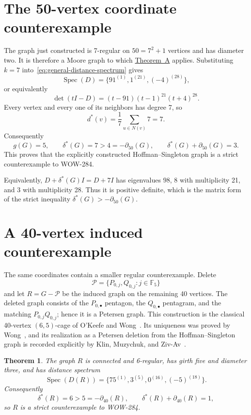 \documentclass[a4paper,11pt,reqno]{amsart}
\theoremstyle{plain}
\newtheorem{theorem}{Theorem}[section]
\theoremstyle{definition}
\theoremstyle{remark}
\newcommand{\F}{\mathbb F_5}
\newcommand{\Spec}{\operatorname{Spec}}
\begin{document}
\section{The 50-vertex coordinate counterexample}

The graph just constructed is 7-regular on \(50=7^2+1\) vertices and has
diameter two.  It is therefore a Moore graph to which
\hyperref[thm:moore-wow]{Theorem~A} applies.  Substituting \(k=7\)
into~\eqref{eq:general-distance-spectrum} gives
\begin{equation}\label{eq:distance-spectrum}
 \Spec(D)=\{91^{(1)},1^{(21)},(-4)^{(28)}\},
\end{equation}
or equivalently
\[
 \det(tI-D)=(t-91)(t-1)^{21}(t+4)^{28}.
\]
Every vertex and every one of its neighbors has degree 7, so
\[
 d^*(v)=\frac{1}{7}\sum_{u\in N(v)}7=7.
\]
Consequently
\[
 g(G)=5,\qquad \delta^*(G)=7>4=-\partial_{50}(G),
 \qquad \delta^*(G)+\partial_{50}(G)=3.
\]
This proves that the explicitly constructed Hoffman--Singleton graph is a
strict counterexample to WOW-284.

Equivalently, \(D+\delta^*(G)I=D+7I\) has eigenvalues
\(98\), \(8\) with multiplicity 21, and \(3\) with multiplicity 28.  Thus
it is positive definite, which is the matrix form of the strict inequality
\(\delta^*(G)>-\partial_{50}(G)\).

\section{A 40-vertex induced counterexample}\label{sec:forty}

The same coordinates contain a smaller regular counterexample.  Delete
\[
 \mathcal P=\{P_{0,j},Q_{0,j}:j\in\F\}
\]
and let \(R=G-\mathcal P\) be the induced graph on the remaining 40 vertices.
The deleted graph consists of the \(P_{0,\bullet}\) pentagon, the
\(Q_{0,\bullet}\) pentagram, and the matching \(P_{0,j}Q_{0,j}\); hence it
is a Petersen graph.  This construction is the classical 40-vertex
\((6,5)\)-cage of O'Keefe and
Wong~\cite{OKeefeWong1979}.  Its uniqueness was proved by
Wong~\cite{Wong1979}, and its realization as a Petersen deletion from the
Hoffman--Singleton graph is recorded explicitly by Klin, Muzychuk, and
Ziv-Av~\cite[Section~3.6]{KlinMuzychukZivAv2009}.

\begin{theorem}\label{thm:forty}
The graph \(R\) is connected and 6-regular, has girth five and diameter three,
and has distance spectrum
\[
 \Spec(D(R))=\{75^{(1)},3^{(5)},0^{(16)},(-5)^{(18)}\}.
\]
Consequently
\[
 \delta^*(R)=6>5=-\partial_{40}(R),
 \qquad \delta^*(R)+\partial_{40}(R)=1,
\]
so \(R\) is a strict counterexample to WOW-284.
\end{theorem}
\end{document}
